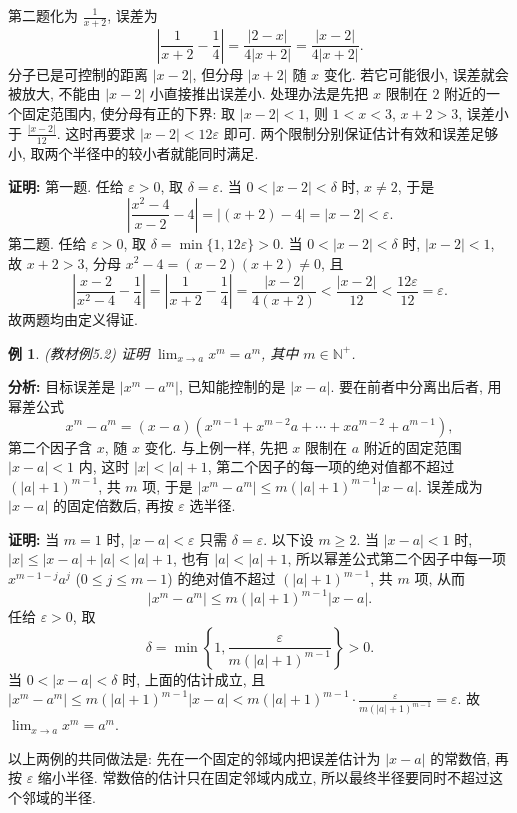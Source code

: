 \documentclass[UTF8,openany]{ctexbook}
\theoremstyle{chinesetextbook}
\newtheorem{example}{例}[section]
\newenvironment{cnproof}{\par\indent\textbf{证明:} \ignorespaces}{\par}
\begin{document}
第二题化为 $\displaystyle\frac1{x+2}$, 误差为
\[
\left|\frac1{x+2}-\frac14\right|=\frac{|2-x|}{4|x+2|}=\frac{|x-2|}{4|x+2|}.
\]
分子已是可控制的距离 $|x-2|$, 但分母 $|x+2|$ 随 $x$ 变化. 若它可能很小, 误差就会被放大, 不能由 $|x-2|$ 小直接推出误差小. 处理办法是先把 $x$ 限制在 $2$ 附近的一个固定范围内, 使分母有正的下界: 取 $|x-2|<1$, 则 $1<x<3$, $x+2>3$, 误差小于 $\displaystyle\frac{|x-2|}{12}$. 这时再要求 $|x-2|<12\varepsilon$ 即可. 两个限制分别保证估计有效和误差足够小, 取两个半径中的较小者就能同时满足.
\begin{cnproof}
第一题. 任给 $\varepsilon>0$, 取 $\delta=\varepsilon$. 当 $0<|x-2|<\delta$ 时, $x\ne2$, 于是
\[
\left|\frac{x^2-4}{x-2}-4\right|=|(x+2)-4|=|x-2|<\varepsilon.
\]
第二题. 任给 $\varepsilon>0$, 取 $\delta=\min\{1,12\varepsilon\}>0$. 当 $0<|x-2|<\delta$ 时, $|x-2|<1$, 故 $x+2>3$, 分母 $x^2-4=(x-2)(x+2)\ne0$, 且
\[
\left|\frac{x-2}{x^2-4}-\frac14\right|
=\left|\frac1{x+2}-\frac14\right|
=\frac{|x-2|}{4(x+2)}<\frac{|x-2|}{12}<\frac{12\varepsilon}{12}=\varepsilon.
\]
故两题均由定义得证.
\end{cnproof}
\begin{example}
\textnormal{(教材例5.2)} 证明 $\displaystyle \lim_{x\to a}x^m=a^m$, 其中 $m\in\mathbb N^+$.
\end{example}
\par\indent\textbf{分析:} 目标误差是 $|x^m-a^m|$, 已知能控制的是 $|x-a|$. 要在前者中分离出后者, 用幂差公式
\[
x^m-a^m=(x-a)(x^{m-1}+x^{m-2}a+\cdots+xa^{m-2}+a^{m-1}),
\]
第二个因子含 $x$, 随 $x$ 变化. 与上例一样, 先把 $x$ 限制在 $a$ 附近的固定范围 $|x-a|<1$ 内, 这时 $|x|<|a|+1$, 第二个因子的每一项的绝对值都不超过 $(|a|+1)^{m-1}$, 共 $m$ 项, 于是 $|x^m-a^m|\le m(|a|+1)^{m-1}|x-a|$. 误差成为 $|x-a|$ 的固定倍数后, 再按 $\varepsilon$ 选半径.
\begin{cnproof}
当 $m=1$ 时, $|x-a|<\varepsilon$ 只需 $\delta=\varepsilon$. 以下设 $m\ge2$. 当 $|x-a|<1$ 时, $|x|\le|x-a|+|a|<|a|+1$, 也有 $|a|<|a|+1$, 所以幂差公式第二个因子中每一项 $x^{m-1-j}a^{j}$ ($0\le j\le m-1$) 的绝对值不超过 $(|a|+1)^{m-1}$, 共 $m$ 项, 从而
\[
|x^m-a^m|\le m(|a|+1)^{m-1}|x-a|.
\]
任给 $\varepsilon>0$, 取
\[
\delta=\min\left\{1,\frac\varepsilon{m(|a|+1)^{m-1}}\right\}>0.
\]
当 $0<|x-a|<\delta$ 时, 上面的估计成立, 且 $\displaystyle|x^m-a^m|\le m(|a|+1)^{m-1}|x-a|<m(|a|+1)^{m-1}\cdot\frac\varepsilon{m(|a|+1)^{m-1}}=\varepsilon$. 故 $\displaystyle\lim_{x\to a}x^m=a^m$.
\end{cnproof}
以上两例的共同做法是: 先在一个固定的邻域内把误差估计为 $|x-a|$ 的常数倍, 再按 $\varepsilon$ 缩小半径. 常数倍的估计只在固定邻域内成立, 所以最终半径要同时不超过这个邻域的半径.
\end{document}
